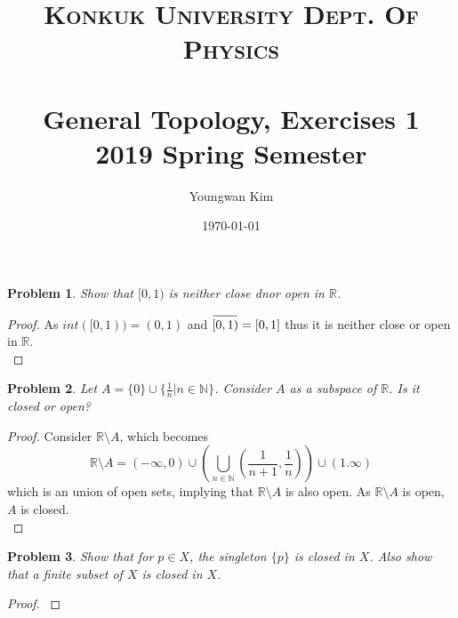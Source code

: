 \documentclass[paper=a4, fontsize=11pt]{scrartcl}
\title{	
	\normalfont \normalsize 
	\textsc{Konkuk University Dept. Of Physics} \\ [25pt] %
	\horrule{1pt} \\[0.4cm] 
	\huge General Topology, Exercises 1 \\
	\vspace{0.1in}
	\Large 2019 Spring Semester
	\horrule{1pt} \\[0.4cm] 
}
\author{Youngwan Kim}
\date{\normalsize\today}
\newcommand{\overbar}[1]{
	\mkern 1.5mu \overline{\mkern-1.5mu\raisebox{0pt}[\dimexpr\height+0.5mm\relax]{$#1$}\mkern-1.5mu}\mkern 1.5mu
}
\newtheorem{problem}{Problem}
\begin{document}
	
\maketitle	

\begin{problem}
	Show that $[0,1)$ is neither close dnor open in $\mathbb{R}$.\\
\end{problem}

\begin{proof}
	As $int([0,1))=(0,1)$ and $\overbar{[0,1)} = [0,1]$ thus it is neither close or open in $\mathbb{R}$.\\
\end{proof}

\begin{problem}
	Let $A=\{0\}\cup\{\frac{1}{n} | n \in \mathbb{N}\}$. Consider $A$ as a subspace of $\mathbb{R}$. Is it closed or open?\\
\end{problem}

\begin{proof}
	Consider $\mathbb{R}\setminus A$, which becomes
	\begin{equation}\nonumber
		\mathbb{R}\setminus A = (-\infty,0) \cup \left( \bigcup\limits_{n \in \mathbb{N}} \left(\frac{1}{n+1} , \frac{1}{n}\right) \right) \cup (1.\infty)
	\end{equation}
	which is an union of open sets, implying that $\mathbb{R}\setminus A$ is also open. As $\mathbb{R}\setminus A$ is open, $A$ is closed.\\
\end{proof}

\begin{problem}
	Show that for $p \in X$, the singleton $\{p\}$ is closed in $X$. Also show that a finite subset of $X$ is closed in $X$. \\
\end{problem}


\begin{proof}
$ $ \newline
\vspace{-0.15in}
\end{proof}
\end{document}
